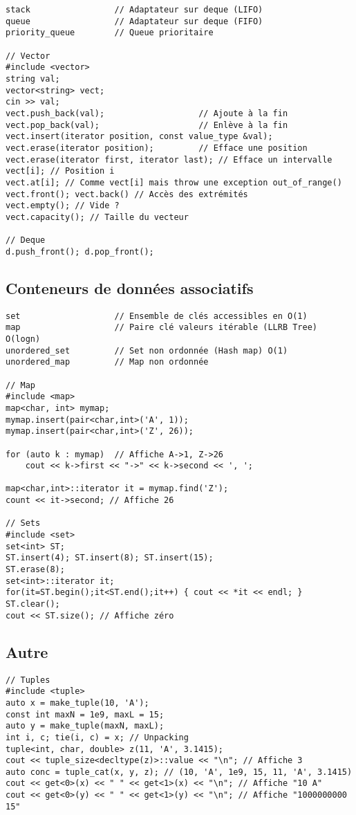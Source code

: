 \documentclass{article}
\begin{document}
\begin{multicols*}{3}
\begin{lstlisting}
stack                 // Adaptateur sur deque (LIFO)
queue                 // Adaptateur sur deque (FIFO)
priority_queue        // Queue prioritaire

// Vector
#include <vector>
string val;
vector<string> vect;
cin >> val;
vect.push_back(val);                   // Ajoute à la fin
vect.pop_back(val);                    // Enlève à la fin
vect.insert(iterator position, const value_type &val);
vect.erase(iterator position);         // Efface une position
vect.erase(iterator first, iterator last); // Efface un intervalle
vect[i]; // Position i
vect.at[i]; // Comme vect[i] mais throw une exception out_of_range()
vect.front(); vect.back() // Accès des extrémités
vect.empty(); // Vide ?
vect.capacity(); // Taille du vecteur

// Deque
d.push_front(); d.pop_front();

\end{lstlisting}

\subsection*{Conteneurs de données associatifs}

\begin{lstlisting}
set                   // Ensemble de clés accessibles en O(1)
map                   // Paire clé valeurs itérable (LLRB Tree) O(logn)
unordered_set         // Set non ordonnée (Hash map) O(1)
unordered_map         // Map non ordonnée

// Map
#include <map>
map<char, int> mymap;
mymap.insert(pair<char,int>('A', 1));
mymap.insert(pair<char,int>('Z', 26));

for (auto k : mymap)  // Affiche A->1, Z->26
    cout << k->first << "->" << k->second << ', ';

map<char,int>::iterator it = mymap.find('Z');
count << it->second; // Affiche 26

// Sets
#include <set>
set<int> ST;
ST.insert(4); ST.insert(8); ST.insert(15);
ST.erase(8);
set<int>::iterator it;
for(it=ST.begin();it<ST.end();it++) { cout << *it << endl; }
ST.clear();
cout << ST.size(); // Affiche zéro
\end{lstlisting}

\subsection*{Autre}

\begin{lstlisting}
// Tuples
#include <tuple>
auto x = make_tuple(10, 'A');
const int maxN = 1e9, maxL = 15;
auto y = make_tuple(maxN, maxL);
int i, c; tie(i, c) = x; // Unpacking
tuple<int, char, double> z(11, 'A', 3.1415);
cout << tuple_size<decltype(z)>::value << "\n"; // Affiche 3
auto conc = tuple_cat(x, y, z); // (10, 'A', 1e9, 15, 11, 'A', 3.1415)
cout << get<0>(x) << " " << get<1>(x) << "\n"; // Affiche "10 A"
cout << get<0>(y) << " " << get<1>(y) << "\n"; // Affiche "1000000000 15"


\end{lstlisting}
\end{multicols*}
\end{document}
